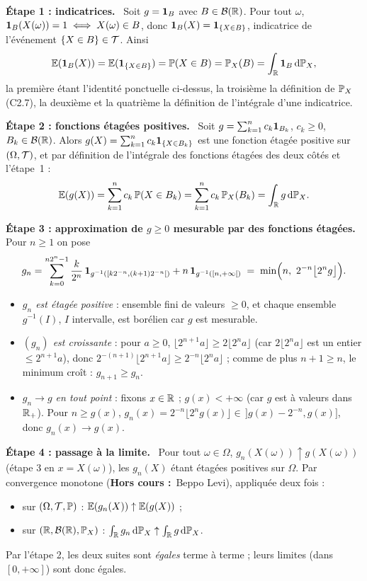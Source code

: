 \documentclass[11pt,a4paper]{article}
\newcommand{\question}[1]{\par\medskip\noindent\textbf{#1}~}
\newcommand{\HC}{\textbf{Hors cours :}~}
\begin{document}
\begin{exo}
\question{Étape 1 : indicatrices.} Soit $g=\mathbf{1}_B$ avec $B\in\mathcal{B}(\mathbb{R})$. Pour tout $\omega$, $\mathbf{1}_B(X(\omega))=1\iff X(\omega)\in B$,
donc $\mathbf{1}_B(X)=\mathbf{1}_{\{X\in B\}}$, indicatrice de l'événement $\{X\in B\}\in\mathcal{T}$. Ainsi
\[\mathbb{E}(\mathbf{1}_B(X))=\mathbb{E}(\mathbf{1}_{\{X\in B\}})=\mathbb{P}(X\in B)=\mathbb{P}_X(B)=\int_{\mathbb{R}}\mathbf{1}_B\,\mathrm{d}\mathbb{P}_X,\]
la première étant l'identité ponctuelle ci-dessus, la troisième la définition de $\mathbb{P}_X$ (C2.7), la deuxième et la quatrième
la définition de l'intégrale d'une indicatrice.

\question{Étape 2 : fonctions étagées positives.} Soit $g=\sum_{k=1}^n c_k\mathbf{1}_{B_k}$, $c_k\ge0$, $B_k\in\mathcal{B}(\mathbb{R})$. Alors
$g(X)=\sum_{k=1}^n c_k\mathbf{1}_{\{X\in B_k\}}$ est une fonction étagée positive sur $(\Omega,\mathcal{T})$, et par définition de l'intégrale des
fonctions étagées des deux côtés et l'étape~1 :
\[\mathbb{E}(g(X))=\sum_{k=1}^n c_k\,\mathbb{P}(X\in B_k)=\sum_{k=1}^n c_k\,\mathbb{P}_X(B_k)=\int_{\mathbb{R}} g\,\mathrm{d}\mathbb{P}_X.\]

\question{Étape 3 : approximation de $g\ge0$ mesurable par des fonctions étagées.} Pour $n\ge1$ on pose
\[g_n=\sum_{k=0}^{n2^n-1}\frac{k}{2^n}\,\mathbf{1}_{g^{-1}\left([k2^{-n},(k+1)2^{-n}[\right)}+n\,\mathbf{1}_{g^{-1}([n,+\infty[)}
\;=\;\min\Bigl(n,\ 2^{-n}\bigl\lfloor 2^n g\bigr\rfloor\Bigr).\]
\begin{itemize}
  \item \emph{$g_n$ est étagée positive} : ensemble fini de valeurs $\ge0$, et chaque ensemble $g^{-1}(I)$, $I$ intervalle, est borélien
  car $g$ est mesurable.
  \item \emph{$(g_n)$ est croissante} : pour $a\ge0$, $\lfloor 2^{n+1}a\rfloor\ge 2\lfloor 2^n a\rfloor$ (car $2\lfloor 2^na\rfloor$ est un entier
  $\le 2^{n+1}a$), donc $2^{-(n+1)}\lfloor 2^{n+1}a\rfloor\ge 2^{-n}\lfloor 2^na\rfloor$ ; comme de plus $n+1\ge n$, le minimum croît :
  $g_{n+1}\ge g_n$.
  \item \emph{$g_n\to g$ en tout point} : fixons $x\in\mathbb{R}$ ; $g(x)<+\infty$ (car $g$ est à valeurs dans $\mathbb{R}_+$). Pour $n\ge g(x)$,
  $g_n(x)=2^{-n}\lfloor 2^ng(x)\rfloor\in\,]g(x)-2^{-n},g(x)]$, donc $g_n(x)\to g(x)$.
\end{itemize}

\question{Étape 4 : passage à la limite.} Pour tout $\omega\in\Omega$, $g_n(X(\omega))\uparrow g(X(\omega))$ (étape 3 en $x=X(\omega)$),
les $g_n(X)$ étant étagées positives sur $\Omega$. Par convergence monotone (\HC Beppo Levi), appliquée deux fois :
\begin{itemize}
  \item sur $(\Omega,\mathcal{T},\mathbb{P})$ : $\mathbb{E}(g_n(X))\uparrow\mathbb{E}(g(X))$ ;
  \item sur $(\mathbb{R},\mathcal{B}(\mathbb{R}),\mathbb{P}_X)$ : $\int_{\mathbb{R}} g_n\,\mathrm{d}\mathbb{P}_X\uparrow\int_{\mathbb{R}} g\,\mathrm{d}\mathbb{P}_X$.
\end{itemize}
Par l'étape 2, les deux suites sont \emph{égales} terme à terme ; leurs limites (dans $[0,+\infty]$) sont donc égales.


\end{exo}
\end{document}
